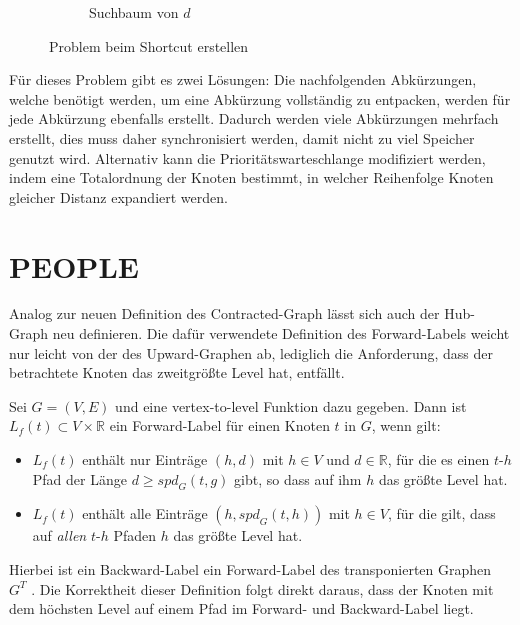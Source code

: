 \begin{figure}[h!]
\begin{subfigure}[b]{0.49\textwidth}
    \caption{Suchbaum von $d$}
  \end{subfigure}
  \caption{Problem beim Shortcut erstellen}
  \label{ch:fig:problem_shortcut}
\end{figure}

Für dieses Problem gibt es zwei Lösungen:
Die nachfolgenden Abkürzungen, welche benötigt werden, um eine Abkürzung vollständig zu entpacken, werden für jede Abkürzung ebenfalls erstellt.
Dadurch werden viele Abkürzungen mehrfach erstellt, dies muss daher synchronisiert werden, damit nicht zu viel Speicher genutzt wird.
Alternativ kann die Prioritätswarteschlange modifiziert werden, indem eine Totalordnung der Knoten bestimmt, in welcher Reihenfolge Knoten gleicher Distanz expandiert werden.

\section{PEOPLE}

Analog zur neuen Definition des Contracted-Graph lässt sich auch der Hub-Graph neu definieren.
Die dafür verwendete Definition des Forward-Labels weicht nur leicht von der des Upward-Graphen ab, lediglich die Anforderung, dass der betrachtete Knoten das zweitgrößte Level hat, entfällt.

\begin{definition}
  Sei $G = (V, E)$ und eine vertex-to-level Funktion dazu gegeben.
  Dann ist $L_f (t) \subset V \times \mathbb{R}$ ein Forward-Label für einen Knoten $t$ in $G$, wenn gilt:

  \begin{itemize}
    \item
          $L_f (t)$ enthält nur Einträge $(h, d)$ mit $h \in V$ und $d \in \mathbb{R}$, für die es einen $t$-$h$ Pfad der Länge $d \geq {spd}_G (t, g)$ gibt, so dass auf ihm $h$ das größte Level hat.

    \item
          $L_f (t)$ enthält alle Einträge $(h, {spd}_G (t, h))$ mit $h \in V$, für die gilt, dass auf \emph{allen} $t$-$h$ Pfaden $h$ das größte Level hat.
  \end{itemize}
\end{definition}


Hierbei ist ein Backward-Label ein Forward-Label des transponierten Graphen $G^T$ .
Die Korrektheit dieser Definition folgt direkt daraus, dass der Knoten mit dem höchsten Level auf einem Pfad im Forward- und Backward-Label liegt.

